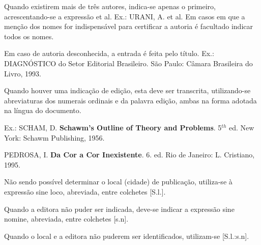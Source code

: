 \documentclass[rel_mlp]{iiufrgs}
\begin{document}
Quando existirem mais de três autores, indica-se apenas o primeiro, acrescentando-se a expressão et al. Ex.: URANI, A. et al. Em casos em que a menção dos nomes for indispensável para certificar a autoria é facultado indicar todos os nomes.

Em caso de autoria desconhecida, a entrada é feita pelo título. Ex.: DIAGNÓSTICO do Setor Editorial Brasileiro. São Paulo: Câmara Brasileira do Livro, 1993.

Quando houver uma indicação de edição, esta deve ser transcrita, utilizando-se abreviaturas dos numerais ordinais e da palavra edição, ambas na forma adotada na língua do documento.

Ex.: SCHAM, D. {\bf Schawm's Outline of Theory and Problems}. 5${}^{th}$ ed. New York: Schawm Publishing, 1956.

PEDROSA, I. {\bf Da Cor a Cor Inexistente}. 6. ed. Rio de Janeiro: L. Cristiano, 1995.

Não sendo possível determinar o local (cidade) de publicação, utiliza-se à expressão sine loco, abreviada, entre colchetes [S.l.].

Quando a editora não puder ser indicada, deve-se indicar a expressão sine nomine, abreviada, entre colchetes [s.n].

Quando o local e a editora não puderem ser identificados, utilizam-se [S.l.:s.n].
\end{document}
